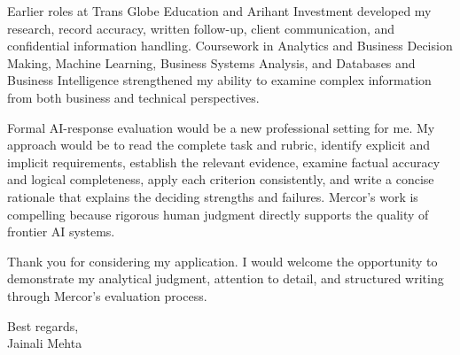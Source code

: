 \documentclass[letterpaper,11pt]{article}
\begin{document}
\bigbreak
Earlier roles at Trans Globe Education and Arihant Investment developed my research, record accuracy, written follow-up, client communication, and confidential information handling. Coursework in Analytics and Business Decision Making, Machine Learning, Business Systems Analysis, and Databases and Business Intelligence strengthened my ability to examine complex information from both business and technical perspectives.

\bigbreak
Formal AI-response evaluation would be a new professional setting for me. My approach would be to read the complete task and rubric, identify explicit and implicit requirements, establish the relevant evidence, examine factual accuracy and logical completeness, apply each criterion consistently, and write a concise rationale that explains the deciding strengths and failures. Mercor's work is compelling because rigorous human judgment directly supports the quality of frontier AI systems.

\bigbreak
Thank you for considering my application. I would welcome the opportunity to demonstrate my analytical judgment, attention to detail, and structured writing through Mercor's evaluation process.

\bigbreak
Best regards,\\
Jainali Mehta
\end{document}
